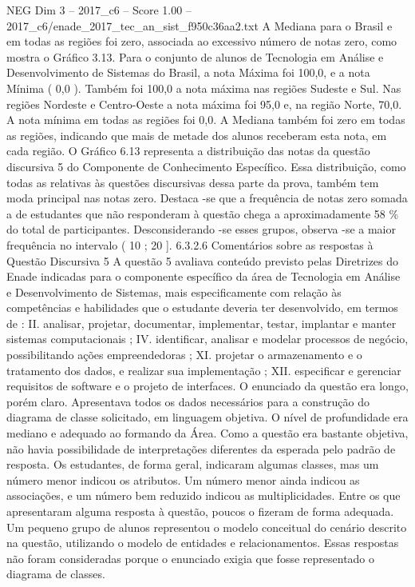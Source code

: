 \begin{textsample}{NEG Dim 3 – 2017\_c6 – Score 1.00 – 2017\_c6/enade\_2017\_tec\_an\_sist\_f950c36aa2.txt}
A Mediana para o Brasil e em todas as regiões foi zero, associada ao excessivo número de notas zero, como mostra o Gráfico 3.13.
Para o conjunto de alunos de Tecnologia em Análise e Desenvolvimento de Sistemas do Brasil, a nota Máxima foi 100,0, e a nota Mínima ( 0,0 ).
Também foi 100,0 a nota máxima nas regiões Sudeste e Sul.
Nas regiões Nordeste e Centro-Oeste a nota máxima foi 95,0 e, na região Norte, 70,0.
A nota mínima em todas as regiões foi 0,0.
A Mediana também foi zero em todas as regiões, indicando que mais de metade dos alunos receberam esta nota, em cada região.
O Gráfico 6.13 representa a distribuição das notas da questão discursiva 5 do Componente de Conhecimento Específico.
Essa distribuição, como todas as relativas às questões discursivas dessa parte da prova, também tem moda principal nas notas zero.
Destaca -se que a frequência de notas zero somada a de estudantes que não responderam à questão chega a aproximadamente 58 \% do total de participantes.
Desconsiderando -se esses grupos, observa -se a maior frequência no intervalo ( 10 ; 20 ]. 6.3.2.6 Comentários sobre as respostas à Questão Discursiva 5 A questão 5 avaliava conteúdo previsto pelas Diretrizes do Enade indicadas para o componente específico da área de Tecnologia em Análise e Desenvolvimento de Sistemas, mais especificamente com relação às competências e habilidades que o estudante deveria ter desenvolvido, em termos de : II. analisar, projetar, documentar, implementar, testar, implantar e manter sistemas computacionais ; IV. identificar, analisar e modelar processos de negócio, possibilitando ações empreendedoras ; XI. projetar o armazenamento e o tratamento dos dados, e realizar sua implementação ; XII. especificar e gerenciar requisitos de software e o projeto de interfaces.
O enunciado da questão era longo, porém claro.
Apresentava todos os dados necessários para a construção do diagrama de classe solicitado, em linguagem objetiva.
O nível de profundidade era mediano e adequado ao formando da Área.
Como a questão era bastante objetiva, não havia possibilidade de interpretações diferentes da esperada pelo padrão de resposta.
Os estudantes, de forma geral, indicaram algumas classes, mas um número menor indicou os atributos.
Um número menor ainda indicou as associações, e um número bem reduzido indicou as multiplicidades.
Entre os que apresentaram alguma resposta à questão, poucos o fizeram de forma adequada.
Um pequeno grupo de alunos representou o modelo conceitual do cenário descrito na questão, utilizando o modelo de entidades e relacionamentos.
Essas respostas não foram consideradas porque o enunciado exigia que fosse representado o diagrama de classes.

\end{textsample}
